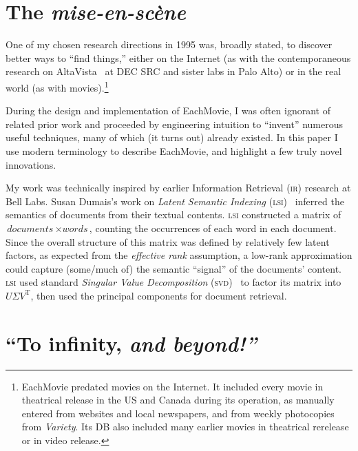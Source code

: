 \documentclass[sigconf,authorversion,screen,microtype={protrusion=true,expansion,kerning,spacing}]{acmart}
\begin{document}
\section{The \textit{mise-en-sc{\`e}ne}}%
\label{section:SettingTheScene}

One of my chosen research directions in 1995 was, broadly stated, to discover better ways to ``find things,'' either on the Internet (as with the contemporaneous research on AltaVista~\cite{burrows2000altavista} at DEC SRC and sister labs in Palo Alto) or in the real world (as with movies).\footnote{EachMovie predated movies on the Internet. It included every movie in theatrical release in the US and Canada during its operation, as manually entered from websites and local newspapers, and from weekly photocopies from \textit{Variety}. Its DB also included many earlier movies in theatrical rerelease or in video release.}

During the design and implementation of EachMovie, I was often ignorant of related prior work and proceeded by engineering intuition to ``invent'' numerous useful techniques, many of which (it turns out) already existed. In this paper I use modern terminology to describe EachMovie, and highlight a few truly novel innovations.

My work was technically inspired by earlier Information Retrieval (\textsc{ir}) research at Bell Labs. Susan Dumais's work on \emph{Latent Semantic Indexing} (\textsc{lsi})~\cite{Dumais1988} inferred the semantics of documents from their textual contents. \textsc{lsi} constructed a matrix of $\textit{documents}\, \times \textit{words}$, counting the occurrences of each word in each document. Since the overall structure of this matrix was defined by relatively few latent factors, as expected from the \emph{effective rank} assumption, a low-rank approximation could capture (some/\allowbreak{}much of) the semantic ``signal'' of the documents' content. \textsc{lsi} used standard \emph{Singular Value Decomposition} (\textsc{svd})~\cite{Eckart1936} to factor its matrix into $U{\Sigma}V^\mathrm{T}$, then used the principal components for document retrieval. 

\section{``To infinity, \emph{and beyond!''}}
\end{document}
